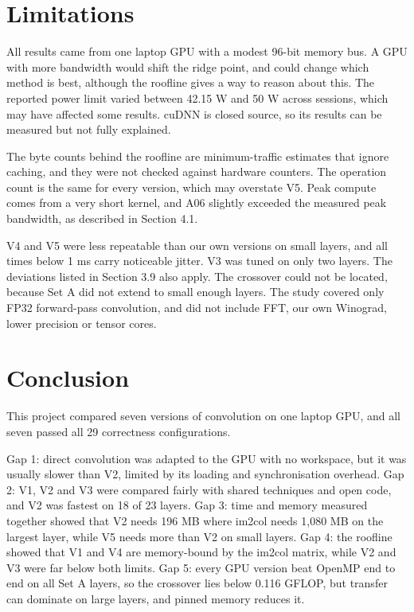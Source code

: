 \documentclass[12pt,a4paper]{article}
\begin{document}
\section{Limitations}
All results came from one laptop GPU with a modest 96-bit memory bus. A GPU with more bandwidth would shift the ridge point, and could change which method is best, although the roofline gives a way to reason about this. The reported power limit varied between 42.15 W and 50 W across sessions, which may have affected some results. cuDNN is closed source, so its results can be measured but not fully explained.

The byte counts behind the roofline are minimum-traffic estimates that ignore caching, and they were not checked against hardware counters. The operation count is the same for every version, which may overstate V5. Peak compute comes from a very short kernel, and A06 slightly exceeded the measured peak bandwidth, as described in Section 4.1.

V4 and V5 were less repeatable than our own versions on small layers, and all times below 1 ms carry noticeable jitter. V3 was tuned on only two layers. The deviations listed in Section 3.9 also apply. The crossover could not be located, because Set A did not extend to small enough layers. The study covered only FP32 forward-pass convolution, and did not include FFT, our own Winograd, lower precision or tensor cores.

\section{Conclusion}
This project compared seven versions of convolution on one laptop GPU, and all seven passed all 29 correctness configurations.

Gap 1: direct convolution was adapted to the GPU with no workspace, but it was usually slower than V2, limited by its loading and synchronisation overhead. Gap 2: V1, V2 and V3 were compared fairly with shared techniques and open code, and V2 was fastest on 18 of 23 layers. Gap 3: time and memory measured together showed that V2 needs 196 MB where im2col needs 1,080 MB on the largest layer, while V5 needs more than V2 on small layers. Gap 4: the roofline showed that V1 and V4 are memory-bound by the im2col matrix, while V2 and V3 were far below both limits. Gap 5: every GPU version beat OpenMP end to end on all Set A layers, so the crossover lies below 0.116 GFLOP, but transfer can dominate on large layers, and pinned memory reduces it.
\end{document}
